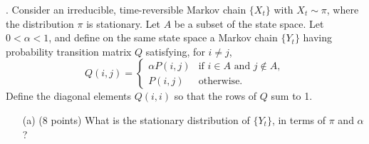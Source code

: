 \documentclass{article}
\begin{document}
\bigskip

. Consider an irreducible, time-reversible Markov chain $\{X_t\}$ with $X_t \sim \pi$, where the distribution $\pi$ is stationary. Let $A$ be a subset of the state space. Let $0 < \alpha < 1$, and define on the same state space a Markov chain $\{Y_t\}$ having probability transition matrix $Q$ satisfying, for $i \neq j$,
\[
Q(i,j) =
\begin{cases}
\alpha P(i,j) & \text{if } i \in A \text{ and } j \notin A, \\
P(i,j) & \text{otherwise}.
\end{cases}
\]
Define the diagonal elements $Q(i,i)$ so that the rows of $Q$ sum to 1.
\begin{itemize}
    \item[(a)] (8 points) What is the stationary distribution of $\{Y_t\}$, in terms of $\pi$ and $\alpha$?


\end{itemize}
\end{document}
